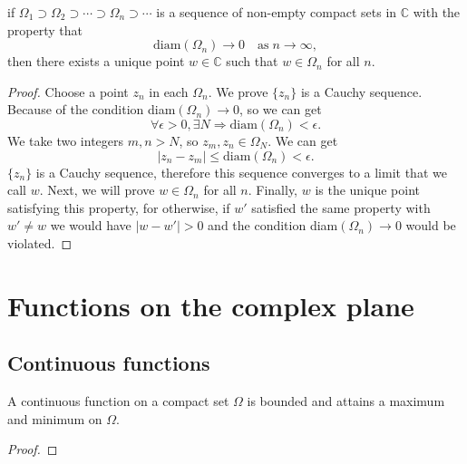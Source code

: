 \begin{proposition}
    if $\Omega_1\supset\Omega_2\supset\cdots\supset\Omega_n\supset\cdots$ is a sequence
    of non-empty compact sets in $\mathbb{C}$ with the property that
    \[
        \text{diam}(\Omega_n)\to 0\quad\text{as}\; n\to\infty,
    \]
    then there exists a unique point $w\in\mathbb{C}$ such
    that $w\in\Omega_n$ for all $n$.
\end{proposition}
\begin{proof}
    Choose a point $z_n$ in each $\Omega_n$. We prove $\{z_n\}$ is a Cauchy sequence.
    Because of the condition diam$(\Omega_n)\to 0$, so we can get
    \[
        \forall \epsilon>0, \exists N\Rightarrow \text{diam}(\Omega_n)<\epsilon.
    \]
    We take two integers $m,n>N$, so $z_m,z_n\in\Omega_N$. We can get
    \[
        |z_n-z_m|\le \text{diam}(\Omega_n)<\epsilon.
    \]
    $\{z_n\}$ is a Cauchy sequence, therefore this sequence converges to a limit that
    we call $w$. Next, we will prove $w\in \Omega_n$ for all $n$. Finally, $w$ is the
    unique point satisfying this property, for otherwise, if $w'$ satisfied the same
    property with $w'\ne w$ we would have $|w-w'|>0$ and the
    condition diam$(\Omega_n)\to 0$ would be violated.
\end{proof}

\section{Functions on the complex plane}

\subsection{Continuous functions}

\begin{theorem}
    A continuous function on a compact set $\Omega$ is bounded and attains
    a maximum and minimum on $\Omega$.
\end{theorem}
\begin{proof}
    
\end{proof}

